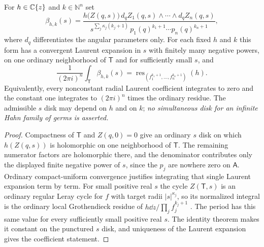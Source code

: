 \documentclass[11pt,letterpaper]{article}
\theoremstyle{definition}
\theoremstyle{remark}
\newcommand{\N}{\mathbb N}\newcommand{\Z}{\mathbb Z}\newcommand{\DD}{\mathbb D}
\newcommand{\res}{\operatorname{res}}\newcommand{\wind}{\operatorname{wind}}
\numberwithin{equation}{section}
\begin{document}
\begin{lemma}
\label{contours:lem:constantperiod}
For $h\in\mathbb C\{z\}$ and $k\in\N^n$ set
\begin{equation}\label{contours:eq:ordinaryform}
  \beta_{h,k}(s)=
  \frac{h\bigl(Z(q,s)\bigr)\,
    d_qZ_1(q,s)\wedge\cdots\wedge d_qZ_n(q,s)}
  {s^{\sum_j\kappa_j(k_j+1)}\,p_1(q)^{k_1+1}\cdots p_n(q)^{k_n+1}},
\end{equation}
where $d_q$ differentiates the angular parameters only. For each fixed $h$ and
$k$ this form has a convergent Laurent expansion in $s$ with finitely many
negative powers, on one ordinary neighborhood of $\mathsf T$ and for
sufficiently small $s$, and
\begin{equation}\label{contours:eq:constantperiod}
  \frac1{(2\pi i)^n}\int_{\mathsf T}\beta_{h,k}(s)
  =\res_{(f_1^{k_1+1},\ldots,f_n^{k_n+1})}(h).
\end{equation}
Equivalently, every nonconstant radial Laurent coefficient integrates to zero
and the constant one integrates to $(2\pi i)^n$ times the ordinary residue. The
admissible $s$ disk may depend on $h$ and on $k$; \emph{no simultaneous disk for
an infinite Hahn family of germs is asserted.}
\end{lemma}
\begin{proof}
Compactness of $\mathsf T$ and $Z(q,0)=0$ give an ordinary $s$ disk on which
$h(Z(q,s))$ is holomorphic on one neighborhood of $\mathsf T$. The remaining
numerator factors are holomorphic there, and the denominator contributes only
the displayed finite negative power of $s$, since the $p_j$ are nowhere zero on
$\mathsf A$. Ordinary compact-uniform convergence justifies integrating that single
Laurent expansion term by term. For small positive real $s$ the cycle
$Z(\mathsf T,s)$ is an ordinary regular Leray cycle for $f$ with target radii
$|s|^{\kappa_j}$, so its normalized integral is the ordinary local Grothendieck
residue of $h\dd z/\prod_jf_j^{k_j+1}$ \cite{GriffithsHarris,TajimaNabeshima}.
The period has this same value for every sufficiently small positive real $s$.
The identity theorem makes it constant on the punctured $s$ disk, and uniqueness
of the Laurent expansion gives the coefficient statement.
\end{proof}
\end{document}
